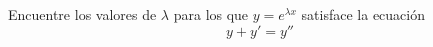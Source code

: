 \item Encuentre los valores de $\lambda$ para los que $y = e^{\lambda x}$ satisface la ecuación
$$y + y' = y''$$
